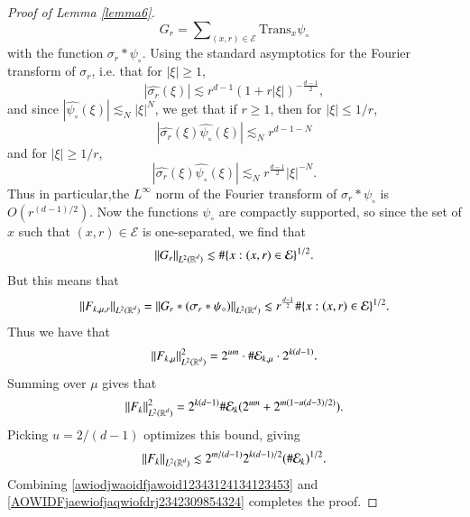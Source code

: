 \begin{proof}[Proof of Lemma \ref{lemma6}]
    \begin{equation}
      G_r = \sum\nolimits_{(x,r) \in \mathcal{E}} \text{Trans}_x \psi_{\circ}
    \end{equation}
    with the function $\sigma_r * \psi_{\circ}$. Using the standard asymptotics for the Fourier transform of $\sigma_r$, i.e. that for $|\xi| \geq 1$,
    \begin{equation}
      |\widehat{\sigma_r}(\xi)| \lesssim r^{d-1} (1 + r |\xi|)^{- \frac{d-1}{2}},
    \end{equation}
    and since $|\widehat{\psi_\circ}(\xi)| \lesssim_N |\xi|^N$, we get that if $r \geq 1$, then for $|\xi| \leq 1/r$,
    \begin{equation}
      |\widehat{\sigma_r}(\xi) \widehat{\psi_\circ}(\xi)| \lesssim_N r^{d-1-N}
    \end{equation}
    and for $|\xi| \geq 1/r$,
    \begin{equation}
      |\widehat{\sigma_r}(\xi) \widehat{\psi_\circ}(\xi)| \lesssim_N r^{\frac{d-1}{2}} |\xi|^{-N}.
    \end{equation}
    Thus in particular,the $L^\infty$ norm of the Fourier transform of $\sigma_r * \psi_\circ$ is $O(r^{(d-1)/2})$. Now the functions $\psi_{\circ}$ are compactly supported, so since the set of $x$ such that $(x,r) \in \mathcal{E}$ is one-separated, we find that
    \begin{equation}
      \| G_r \|_{L^2(\operatorname{\mathbb{R}}^d)} \lesssim \# \{ x : (x,r) \in \mathcal{E} \}^{1/2}.
    \end{equation}
    But this means that
    \begin{equation}
      \| F_{k,\mu,r} \|_{L^2(\operatorname{\mathbb{R}}^d)} = \| G_r * (\sigma_r * \psi_{\circ}) \|_{L^2(\operatorname{\mathbb{R}}^d)} \lesssim r^{\frac{d-1}{2}} \# \{ x : (x,r) \in \mathcal{E} \}^{1/2}.
    \end{equation}
    Thus we have that
    \begin{equation}
      \| F_{k,\mu} \|_{L^2(\operatorname{\mathbb{R}}^d)}^2 = 2^{um} \cdot \# \mathcal{E}_{k,\mu} \cdot 2^{k(d-1)}.
    \end{equation}
    Summing over $\mu$ gives that
    \begin{equation}
      \| F_k \|_{L^2(\operatorname{\mathbb{R}}^d)}^2 = 2^{k(d-1)} \# \mathcal{E}_k (2^{um}  + 2^{m(1 - u(d-3)/2)}).
    \end{equation}
    Picking $u = 2/(d-1)$ optimizes this bound, giving
    \begin{equation} \label{AOWIDFjaewiofjaqwiofdrj2342309854324}
      \| F_k \|_{L^2(\operatorname{\mathbb{R}}^d)} \lesssim 2^{m/(d-1)} 2^{k(d-1)/2} (\# \mathcal{E}_k)^{1/2}.
    \end{equation}
    Combining \eqref{awiodjwaoidfjawoid12343124134123453} and \eqref{AOWIDFjaewiofjaqwiofdrj2342309854324} completes the proof.
\end{proof}

